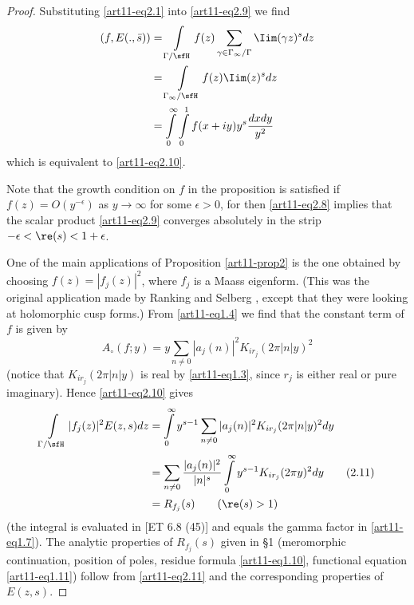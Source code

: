 \begin{proof}
Substituting \eqref{art11-eq2.1} into \eqref{art11-eq2.9} we find 
\begin{align*}
(f, E (., \bar{s})) & = \int\limits_{\Gamma / \sfH} f(z) \sum\limits_{\gamma  \in\Gamma_\infty/ \Gamma} \Iim (\gamma z)^s dz \\
& =\int\limits_{\Gamma_\infty/ \sfH} f(z) \Iim (z)^s dz\\
& = \int\limits^\infty_{0} \int\limits^1_0 f (x + iy) y^s \frac{dx dy}{y^2}
\end{align*}
which is equivalent to \eqref{art11-eq2.10}.

Note that the growth condition on $f$ in the proposition is satisfied if $f(z) = O (y^{-\epsilon})$ as $y \to \infty$ for some $\epsilon >0$, for then \eqref{art11-eq2.8} implies that the scalar product \eqref{art11-eq2.9} converges absolutely in the strip $-\epsilon < \re (s) < 1+ \epsilon$.

One of the main applications of Proposition \eqref{art11-prop2} is the one obtained by choosing $f(z) = |f_j(z)|^2$, where $f_j$ is a Maass eigenform. (This was the original application made by Ranking \cite{art11-5} and Selberg \cite{art11-6}, except that they were looking at holomorphic cusp forms.) From \eqref{art11-eq1.4} we find that the constant term of $f$ is given by 
$$
A_\circ (f; y) = y \sum\limits_{n \neq 0} |a_j (n)|^2 K_{ir_j} (2\pi|n|y)^2
$$
(notice that $K_{ir_j} (2\pi|n|y)$ is real by \eqref{art11-eq1.3}, since $r_j$ is either real or pure imaginary). Hence \eqref{art11-eq2.10} gives 
\begin{align*}
\int\limits_{\Gamma / \sfH} |f_j(z)|^2 E (z,s) dz & = \int\limits^\infty_0 y^{s-1} \sum\limits_{n \neq 0} |a_j(n)|^2 K_{ir_j} (2 \pi |n| y)^2 dy\\
& = \sum\limits_{n \neq 0} \frac{|a_j(n)|^2}{|n|^s} \int\limits^\infty_{0} y^{s-1} K_{ir_j} (2\pi y)^2 dy \tag{2.11}\label{art11-eq2.11}\\
& = R_{f_j}(s) \qquad (\re (s) > 1)
\end{align*}
(the integral is evaluated in [ET 6.8 (45)] and equals the gamma factor in \eqref{art11-eq1.7}). The analytic properties of $R_{f_j}(s)$ given in \S 1 (meromorphic continuation, position of poles, residue formula \eqref{art11-eq1.10}, functional equation \eqref{art11-eq1.11}) follow from \eqref{art11-eq2.11} and the corresponding properties of $E(z,s)$.
\end{proof}

